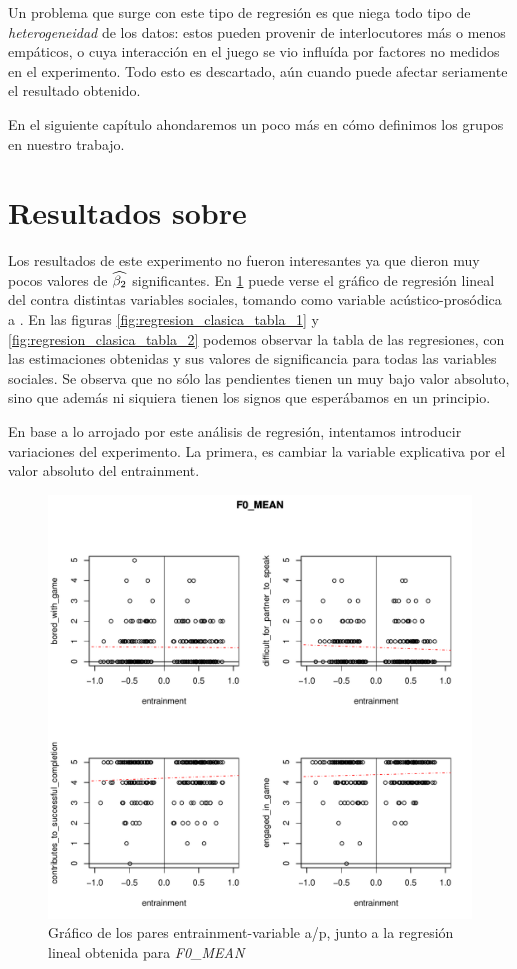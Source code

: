Un problema que surge con este tipo de regresión es que niega todo tipo de \emph{heterogeneidad} de los datos: estos pueden provenir de interlocutores más o menos empáticos, o cuya interacción en el juego se vio influída por factores no medidos en el experimento. Todo esto es descartado, aún cuando puede afectar seriamente  el resultado obtenido.

En el siguiente capítulo ahondaremos un poco más en cómo definimos los grupos en nuestro trabajo.

\section{Resultados sobre \entrainment}

Los resultados de este experimento no fueron interesantes ya que dieron muy pocos valores de $\widehat{\beta_2}$ significantes. En \ref{fig:regresion_clasica} puede verse el gráfico de regresión lineal del \entrainment contra distintas variables sociales, tomando como variable acústico-prosódica a \FOMEAN. En las figuras \ref{fig:regresion_clasica_tabla_1} y \ref{fig:regresion_clasica_tabla_2} podemos observar la tabla de las regresiones, con las estimaciones obtenidas y sus valores de significancia para todas las variables sociales. Se observa que no sólo las pendientes tienen un muy bajo valor absoluto, sino que además ni siquiera tienen los signos que esperábamos en un principio.

En base a lo arrojado por este análisis de regresión, intentamos introducir variaciones del experimento. La primera, es cambiar la variable explicativa por el valor absoluto del entrainment.


\begin{figure}[b!]
\includegraphics[width=15cm]{images/regression_F0_MEAN_1.pdf}
\caption{Gráfico de los pares entrainment-variable a/p, junto a la regresión lineal obtenida para \emph{F0\_MEAN}}
\label{fig:regresion_clasica}
\end{figure}


